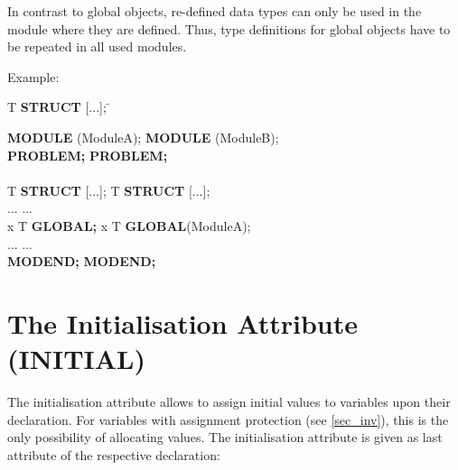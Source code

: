 In contrast to global objects, re-defined data types can only be used
in the module where they are defined. Thus, type definitions for
global objects have to be repeated in all used modules.

Example:

\begin{tabbing}
 T {\bf STRUCT} [...]; \hspace{2cm} \= \kill

{\bf MODULE} (ModuleA);            \> {\bf MODULE} (ModuleB);\\
{\bf PROBLEM;}                      \> {\bf PROBLEM;}\\
                                    \> \\
 T {\bf STRUCT} [...]; \>  T {\bf STRUCT} [...];\\
\x ...                              \> \x ... \\
 x T {\bf GLOBAL;}      \>  x T {\bf GLOBAL}(ModuleA); \\
\x ...                              \> \x ...\\
{\bf MODEND;}                       \> {\bf MODEND;}
\end{tabbing}


\section{The Initialisation Attribute (INITIAL)}   %

The initialisation attribute allows to assign initial values to
variables upon their declaration. For variables with assignment
protection (see \ref{sec_inv}), this is the only possibility of allocating
values. The initialisation attribute is given as last attribute of the
respective declaration:







